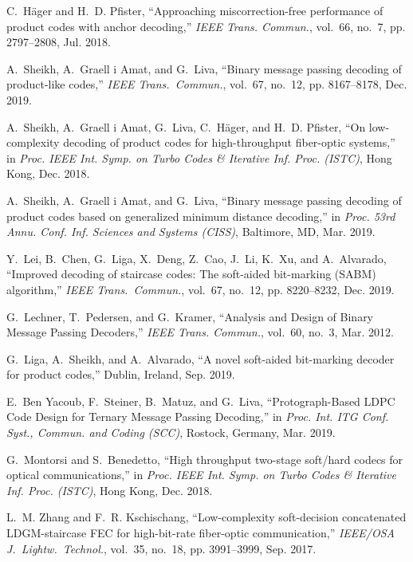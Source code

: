 \documentclass[journal]{IEEEtran}
\begin{document}
\begin{thebibliography}{10}
	C.~H{\"{a}}ger and H.~D. Pfister, ``Approaching miscorrection-free performance
	of product codes with anchor decoding,'' \emph{IEEE Trans. Commun.}, vol.~66,
	no.~7, pp. 2797--2808, Jul. 2018.
	
	A.~Sheikh, A.~{Graell i Amat}, and G.~Liva, ``Binary message passing decoding
	of product-like codes,'' \emph{IEEE Trans.\ Commun.}, vol.~67, no.~12, pp.
	8167--8178, Dec. 2019.
	
	A.~Sheikh, A.~{Graell i Amat}, G.~Liva, C.~H\"ager, and H.~D. Pfister, ``On
	low-complexity decoding of product codes for high-throughput fiber-optic
	systems,'' in \emph{Proc. IEEE Int. Symp. on Turbo Codes \& Iterative Inf.
		Proc. (ISTC)}, Hong Kong, Dec. 2018.
	
	A.~Sheikh, A.~{Graell i Amat}, and G.~Liva, ``Binary message passing decoding
	of product codes based on generalized minimum distance decoding,'' in
	\emph{Proc. 53rd Annu. Conf. Inf. Sciences and Systems (CISS)}, Baltimore,
	MD, Mar. 2019.
	
	Y.~Lei, B.~Chen, G.~Liga, X.~Deng, Z.~Cao, J.~Li, K.~Xu, and A.~Alvarado,
	``Improved decoding of staircase codes: The soft-aided bit-marking {(SABM)}
	algorithm,'' \emph{IEEE Trans.\ Commun.}, vol.~67, no.~12, pp. 8220--8232,
	Dec. 2019.
	
	G.~Lechner, T.~Pedersen, and G.~Kramer, ``Analysis and {{Design}} of {{Binary
			Message Passing Decoders}},'' \emph{IEEE Trans. Commun.}, vol.~60, no.~3,
	Mar. 2012.
	
	G.~Liga, A.~Sheikh, and A.~Alvarado, ``A novel soft-aided bit-marking decoder
	for product codes,'' Dublin, Ireland, Sep. 2019.
	
	E.~{Ben Yacoub}, F.~Steiner, B.~Matuz, and G.~Liva, ``{Protograph-Based LDPC
		Code Design for Ternary Message Passing Decoding},'' in \emph{Proc. Int. ITG
		Conf. Syst., Commun. and Coding (SCC)}, Rostock, Germany, Mar. 2019.
	
	G.~{Montorsi} and S.~{Benedetto}, ``High throughput two-stage soft/hard codecs
	for optical communications,'' in \emph{Proc. IEEE Int. Symp. on Turbo Codes
		\& Iterative Inf. Proc. (ISTC)}, Hong Kong, Dec. 2018.
	
	L.~M. Zhang and F.~R. Kschischang, ``Low-complexity soft-decision concatenated
	{LDGM}-staircase {FEC} for high-bit-rate fiber-optic communication,''
	\emph{IEEE/OSA J.\ Lightw.\ Technol.}, vol.~35, no.~18, pp. 3991--3999, Sep.
	2017.
	

\end{thebibliography}
\end{document}
